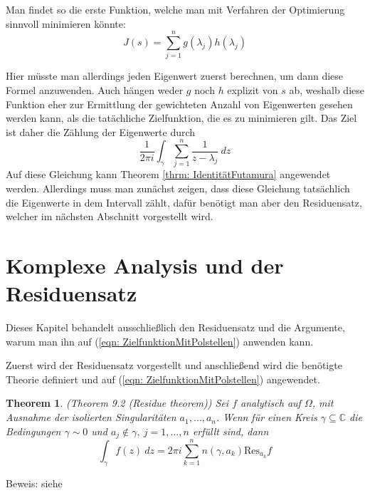 \documentclass[a4paper,12pt]{report}
\newcommand{\C}{\mathbb C}
\newcommand{\1}{\mathds{1}}
\newcommand{\Res}{\text{Res}}
\theoremstyle{plain} %
\newtheorem{theorem}{Theorem}
\theoremstyle{definition} %
\theoremstyle{remark}
\begin{document}
            Man findet so die erste Funktion, welche man mit Verfahren der Optimierung sinnvoll minimieren könnte:
            $$J(s) = \sum_{j=1}^n g(\lambda_j)h(\lambda_j)$$

            Hier müsste man allerdings jeden Eigenwert zuerst berechnen, um dann diese Formel anzuwenden.
            Auch hängen weder $g$ noch $h$ explizit von $s$ ab, weshalb diese Funktion eher zur Ermittlung der gewichteten Anzahl von Eigenwerten gesehen werden kann, als die tatächliche Zielfunktion, die es zu minimieren gilt.
            Das Ziel ist daher die Zählung der Eigenwerte durch
            \begin{equation}
                  \label{eqn: ZielfunktionMitPolstellen}
                  \frac 1 {2\pi i}\int_\gamma \sum_{j=1}^{n} \frac{1}{z-\lambda_j}\ dz
            \end{equation}
            Auf diese Gleichung kann Theorem \ref{thrm: IdentitätFutamura} angewendet werden.
            Allerdings muss man zunächst zeigen, dass diese Gleichung tatsächlich die Eigenwerte in dem Intervall zählt, dafür benötigt man aber den Residuensatz, welcher im nächsten Abschnitt vorgestellt wird.
      \section{Komplexe Analysis und der Residuensatz}
            Dieses Kapitel behandelt ausschließlich den Residuensatz und die Argumente, warum man ihn auf (\ref{eqn: ZielfunktionMitPolstellen}) anwenden kann.
            
            Zuerst wird der Residuensatz vorgestellt und anschließend wird die benötigte Theorie definiert und auf (\ref{eqn: ZielfunktionMitPolstellen}) angewendet.

            \begin{theorem}(Theorem 9.2 (Residue theorem)\cite[S. 141]{complexAnalysis})
                  \label{thrm: Residuensatz}
                  Sei $f$ analytisch auf $\Omega$, mit Ausnahme der isolierten Singularitäten $a_1,\dots,a_n$. Wenn für einen Kreis $\gamma\subseteq\C$ die Bedingungen $\gamma \sim 0$ und $a_j\notin \gamma,\ j=1,\dots,n$ erfüllt sind, dann
                  $$\int_\gamma f(z)\ dz = 2\pi i\sum_{k=1}^{n} n(\gamma, a_k)\Res_{a_k}f$$
            \end{theorem}
            Beweis: siehe \cite[S. 142]{complexAnalysis}
\end{document}
